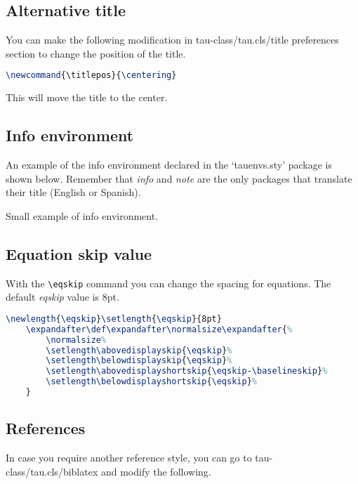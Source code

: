 \documentclass[9pt,a4paper,twocolumn,twoside]{tau-class/tau}
\begin{document}
    \subsection{Alternative title}

        You can make the following modification in tau-class/tau.cls/title preferences section to change the position of the title.

\begin{lstlisting}[language=TeX, caption=Alternative title.]
\newcommand{\titlepos}{\centering}
\end{lstlisting}

        This will move the title to the center. 

    \subsection{Info environment}

        An example of the info environment declared in the ‘tauenvs.sty’ package is shown below. Remember that \textit{info} and \textit{note} are the only packages that translate their title (English or Spanish).
		
	\begin{info}
		Small example of info environment.
	\end{info}

    \subsection{Equation skip value}

        With the \verb|\eqskip| command you can change the spacing for equations. The default \textit{eqskip} value is 8pt.

\begin{lstlisting}[language=TeX, caption=Equation skip code.]
\newlength{\eqskip}\setlength{\eqskip}{8pt}
	\expandafter\def\expandafter\normalsize\expandafter{%
		\normalsize%
		\setlength\abovedisplayskip{\eqskip}%
		\setlength\belowdisplayskip{\eqskip}%
		\setlength\abovedisplayshortskip{\eqskip-\baselineskip}%
		\setlength\belowdisplayshortskip{\eqskip}%
	}
\end{lstlisting}
		
    \subsection{References}
		
        In case you require another reference style, you can go to tau-class/tau.cls/biblatex and modify the following.
		
\end{document}
